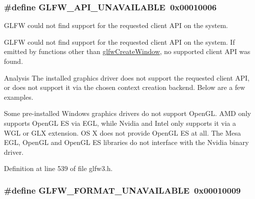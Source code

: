 \subsubsection[{G\+L\+F\+W\+\_\+\+A\+P\+I\+\_\+\+U\+N\+A\+V\+A\+I\+L\+A\+B\+L\+E}]{\setlength{\rightskip}{0pt plus 5cm}\#define G\+L\+F\+W\+\_\+\+A\+P\+I\+\_\+\+U\+N\+A\+V\+A\+I\+L\+A\+B\+L\+E~0x00010006}\label{group__errors_ga56882b290db23261cc6c053c40c2d08e}


G\+L\+F\+W could not find support for the requested client A\+P\+I on the system. 

G\+L\+F\+W could not find support for the requested client A\+P\+I on the system. If emitted by functions other than \hyperlink{group__window_ga680a02abe0e4494b6759d5703240713e}{glfw\+Create\+Window}, no supported client A\+P\+I was found.

\begin{DoxyParagraph}{Analysis}
The installed graphics driver does not support the requested client A\+P\+I, or does not support it via the chosen context creation backend. Below are a few examples.
\end{DoxyParagraph}
\begin{DoxyParagraph}{}
Some pre-\/installed Windows graphics drivers do not support Open\+G\+L. A\+M\+D only supports Open\+G\+L E\+S via E\+G\+L, while Nvidia and Intel only supports it via a W\+G\+L or G\+L\+X extension. O\+S X does not provide Open\+G\+L E\+S at all. The Mesa E\+G\+L, Open\+G\+L and Open\+G\+L E\+S libraries do not interface with the Nvidia binary driver. 
\end{DoxyParagraph}


Definition at line 539 of file glfw3.\+h.

\hypertarget{group__errors_ga196e125ef261d94184e2b55c05762f14}{}
\subsubsection[{G\+L\+F\+W\+\_\+\+F\+O\+R\+M\+A\+T\+\_\+\+U\+N\+A\+V\+A\+I\+L\+A\+B\+L\+E}]{\setlength{\rightskip}{0pt plus 5cm}\#define G\+L\+F\+W\+\_\+\+F\+O\+R\+M\+A\+T\+\_\+\+U\+N\+A\+V\+A\+I\+L\+A\+B\+L\+E~0x00010009}\label{group__errors_ga196e125ef261d94184e2b55c05762f14}


